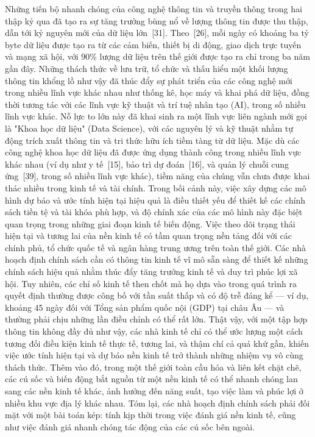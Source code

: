 Những tiến bộ nhanh chóng của công nghệ thông tin và truyền thông trong hai thập kỷ qua đã tạo ra sự tăng trưởng bùng nổ về lượng thông tin được thu thập, dẫn tới kỷ nguyên mới của dữ liệu lớn~[31]. Theo~[26], mỗi ngày có khoảng ba tỷ byte dữ liệu được tạo ra từ các cảm biến, thiết bị di động, giao dịch trực tuyến và mạng xã hội, với 90\% lượng dữ liệu trên thế giới được tạo ra chỉ trong ba năm gần đây. Những thách thức về lưu trữ, tổ chức và thấu hiểu một khối lượng thông tin khổng lồ như vậy đã thúc đẩy sự phát triển của các công nghệ mới trong nhiều lĩnh vực khác nhau như thống kê, học máy và khai phá dữ liệu, đồng thời tương tác với các lĩnh vực kỹ thuật và trí tuệ nhân tạo (AI), trong số nhiều lĩnh vực khác. Nỗ lực to lớn này đã khai sinh ra một lĩnh vực liên ngành mới gọi là "Khoa học dữ liệu" (Data Science), với các nguyên lý và kỹ thuật nhằm tự động trích xuất thông tin và tri thức hữu ích tiềm tàng từ dữ liệu. Mặc dù các công nghệ khoa học dữ liệu đã được ứng dụng thành công trong nhiều lĩnh vực khác nhau (ví dụ như y tế~[15], bảo trì dự đoán~[16], và quản lý chuỗi cung ứng~[39], trong số nhiều lĩnh vực khác), tiềm năng của chúng vẫn chưa được khai thác nhiều trong kinh tế và tài chính. Trong bối cảnh này, việc xây dựng các mô hình dự báo và ước tính hiện tại hiệu quả là điều thiết yếu để thiết kế các chính sách tiền tệ và tài khóa phù hợp, và độ chính xác của các mô hình này đặc biệt quan trọng trong những giai đoạn kinh tế biến động. Việc theo dõi trạng thái hiện tại và tương lai của nền kinh tế có tầm quan trọng nền tảng đối với các chính phủ, tổ chức quốc tế và ngân hàng trung ương trên toàn thế giới. Các nhà hoạch định chính sách cần có thông tin kinh tế vĩ mô sẵn sàng để thiết kế những chính sách hiệu quả nhằm thúc đẩy tăng trưởng kinh tế và duy trì phúc lợi xã hội. Tuy nhiên, các chỉ số kinh tế then chốt mà họ dựa vào trong quá trình ra quyết định thường được công bố với tần suất thấp và có độ trễ đáng kể — ví dụ, khoảng 45 ngày đối với Tổng sản phẩm quốc nội (GDP) tại châu Âu — và thường phải chịu những lần điều chỉnh có thể rất lớn. Thật vậy, với một tập hợp thông tin không đầy đủ như vậy, các nhà kinh tế chỉ có thể ước lượng một cách tương đối điều kiện kinh tế thực tế, tương lai, và thậm chí cả quá khứ gần, khiến việc ước tính hiện tại và dự báo nền kinh tế trở thành những nhiệm vụ vô cùng thách thức. Thêm vào đó, trong một thế giới toàn cầu hóa và liên kết chặt chẽ, các cú sốc và biến động bắt nguồn từ một nền kinh tế có thể nhanh chóng lan sang các nền kinh tế khác, ảnh hưởng đến năng suất, tạo việc làm và phúc lợi ở nhiều khu vực địa lý khác nhau. Tóm lại, các nhà hoạch định chính sách phải đối mặt với một bài toán kép: tính kịp thời trong việc đánh giá nền kinh tế, cũng như việc đánh giá nhanh chóng tác động của các cú sốc bên ngoài.

